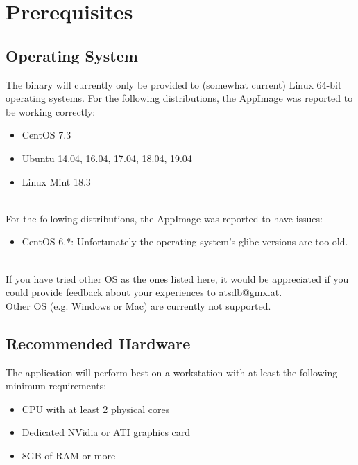 \section{Prerequisites}

\subsection{Operating System}

The binary will currently only be provided to (somewhat current) Linux 64-bit operating systems. For the following distributions, the AppImage was reported to be working correctly:

\begin{itemize}  
\item CentOS 7.3
\item Ubuntu 14.04, 16.04, 17.04, 18.04, 19.04
\item Linux Mint 18.3
\end{itemize}
\ \\

For the following distributions, the AppImage was reported to have issues:

\begin{itemize}  
\item CentOS 6.*: Unfortunately the operating system's glibc versions are too old.
\end{itemize}
\ \\

If you have tried other OS as the ones listed here, it would be appreciated if you could provide feedback about your experiences to \href{mailto:atsdb@gmx.at}{atsdb@gmx.at}.\\

Other OS (e.g. Windows or Mac) are currently not supported.

\subsection{Recommended Hardware}

The application will perform best on a workstation with at least the following minimum requirements:

\begin{itemize}  
\item CPU with at least 2 physical cores
\item Dedicated NVidia or ATI graphics card
\item 8GB of RAM or more
\end{itemize}
\ \\

